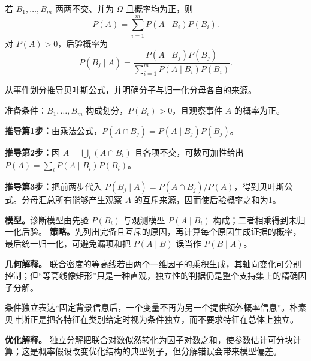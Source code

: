 若 $B_1,\ldots,B_m$ 两两不交、并为 $\Omega$ 且概率均为正，则
\[
P(A)=\sum_{i=1}^{m}P(A\mid B_i)P(B_i).
\]
对 $P(A)>0$，后验概率为
\[
P(B_j\mid A)=\frac{P(A\mid B_j)P(B_j)}{\sum_{i=1}^{m}P(A\mid B_i)P(B_i)}.
\]

\label{struct:V1-C04-CH11}

\begin{derivationgoalbox}
从事件划分推导贝叶斯公式，并明确分子与归一化分母各自的来源。
\end{derivationgoalbox}
\begin{derivationprepbox}
准备条件：$B_1,\ldots,B_m$ 构成划分，$P(B_i)>0$，且观察事件 $A$ 的概率为正。
\end{derivationprepbox}
\textbf{推导第1步：}由乘法公式，$P(A\cap B_j)=P(A\mid B_j)P(B_j)$。

\textbf{推导第2步：}因 $A=\bigcup_i(A\cap B_i)$ 且各项不交，可数可加性给出 $P(A)=\sum_iP(A\mid B_i)P(B_i)$。

\textbf{推导第3步：}把前两步代入 $P(B_j\mid A)=P(A\cap B_j)/P(A)$，得到贝叶斯公式。分母汇总所有能够产生观察 $A$ 的互斥来源，因而使后验概率之和为1。

\label{struct:V1-C04-CH08}
\textbf{模型。}诊断模型由先验 $P(B_i)$ 与观测模型 $P(A\mid B_i)$ 构成；二者相乘得到未归一化后验。
\label{struct:V1-C04-CH09}
\textbf{策略。}先列出完备且互斥的原因，再计算每个原因生成证据的概率，最后统一归一化，可避免漏项和把 $P(A\mid B)$ 误当作 $P(B\mid A)$。

\label{struct:V1-C04-CH10}
\label{struct:V1-C04-CH21}
\label{struct:V1-C04-CH22}
\label{struct:V1-C04-CH23}
\label{struct:V1-C04-CH24}
\label{struct:V1-C04-CH25}
\label{struct:V1-C04-CH26}
\label{struct:V1-C04-CH27}
\begin{geometrybox}
\textbf{几何解释。}
联合密度的等高线若由两个一维因子的乘积生成，其轴向变化可分别控制；但“等高线像矩形”只是一种直观，独立性的判据仍是整个支持集上的精确因子分解。
\end{geometrybox}
\label{struct:V1-C04-CH17}
\begin{probabilitybox}
条件独立表达“固定背景信息后，一个变量不再为另一个提供额外概率信息”。朴素贝叶斯正是把各特征在类别给定时视为条件独立，而不要求特征在总体上独立。
\end{probabilitybox}
\label{struct:V1-C04-CH18}
\begin{optimizationbox}
\textbf{优化解释。}
独立分解把联合对数似然转化为因子对数之和，使参数估计可分块计算；这是概率假设改变优化结构的典型例子，但分解错误会带来模型偏差。
\end{optimizationbox}


